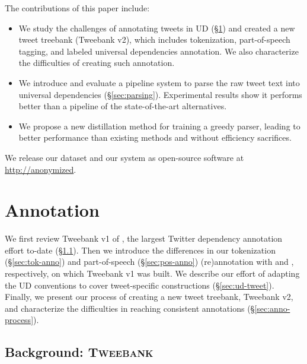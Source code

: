 \documentclass[11pt,a4paper]{article}
\newcommand{\yicomment}[1]{\textcolor{gray}{[#1 ---\textsc{Yi}]}}
\begin{document}
The contributions of this paper include:
\begin{itemize}
\item We study the challenges of annotating tweets in UD (\S\ref{sec:anno})
and created a new tweet treebank ({\sc Tweebank v2}), which includes 
tokenization, part-of-speech tagging, and labeled universal dependencies annotation.
We also characterize the difficulties of creating such annotation.

\item We introduce and evaluate a pipeline system to parse the raw tweet text into
universal dependencies (\S\ref{sec:parsing}).  Experimental results show
it performs better than a pipeline of the state-of-the-art alternatives.

\item We propose a new distillation
method for training a greedy parser, leading to better performance
than existing methods and without efficiency sacrifices.
\end{itemize}

We release our dataset and our system as open-source software at
\url{http://anonymized}. 


\section{Annotation}\label{sec:anno}

We first review {\sc Tweebank v1} of \citet{kong-EtAl:2014:EMNLP2014},
the largest Twitter dependency annotation effort to-date
(\S\ref{sec:tweebank}).
Then we introduce the differences in our tokenization
(\S\ref{sec:tok-anno}) and part-of-speech (\S\ref{sec:pos-anno}) (re)annotation with \citet{ICWSM101540} and 
\citet{gimpel-EtAl:2011:ACL-HLT2011}, respectively, on which {\sc Tweebank v1} was built. 
We describe our effort of adapting the
UD conventions to cover tweet-specific constructions (\S\ref{sec:ud-tweet}). 
Finally, we present our process of creating a new tweet treebank, {\sc
  Tweebank v2}, and characterize
the difficulties in reaching consistent annotations (\S\ref{sec:anno-process}).

\subsection{Background: \textsc{Tweebank}}\label{sec:tweebank}
\end{document}

